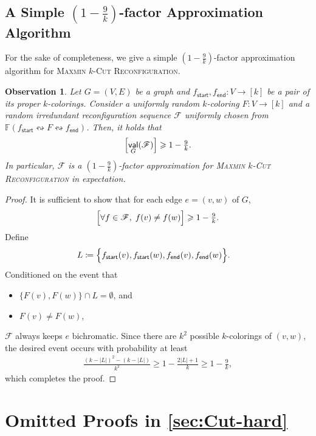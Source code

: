 \documentclass[11pt,fleqn]{article}
\renewcommand{\geq}{\geqslant}
\newcommand{\prb}[1]{\textsc{#1}\xspace}
\newcommand{\reco}{\leftrightsquigarrow}
\newcommand{\defeq}{\coloneq}
\let\E\relax\DeclareMathOperator*{\E}{\mathbb{E}}  \let\Pr\relax\DeclareMathOperator*{\Pr}{\mathbb{Pr}}
\DeclareMathOperator{\val}{\mathsf{val}}
\newcommand{\sss}{\mathsf{start}}
\newcommand{\ttt}{\mathsf{end}}
\newcommand{\f}{f}
\newcommand{\frnd}{F}
\newcommand{\sqcol}{\scrF}
\newcommand{\stsqcol}{\bbF}
\newcommand{\MMkCutReconf}{\prb{Maxmin $k$-Cut Reconfiguration}}
\newcommand{\bbF}{\mathbb{F}}
\newcommand{\scrF}{\mathscr{F}}
\let\Pr\relax\DeclareMathOperator*{\Pr}{\mathbb{P}}
\newtheorem{observation}[theorem]{Observation}
\theoremstyle{definition}
\numberwithin{equation}{section}
\begin{document}
\subsection{A Simple \texorpdfstring{$\left(1-\frac{9}{k}\right)$}{(1-9/k)}-factor Approximation Algorithm}
For the sake of completeness,
we give a simple $\left(1-\frac{9}{k}\right)$-factor approximation algorithm for \MMkCutReconf.

\begin{observation}
\label{obs:Cut-alg:simple}
    Let $G = (V,E)$ be a graph and
    $\f_\sss, \f_\ttt \colon V \to [k]$ be a pair of its proper $k$-colorings.
    Consider a uniformly random $k$-coloring $\frnd \colon V \to [k]$ and
    a random irredundant reconfiguration sequence $\sqcol$
    uniformly chosen from $\stsqcol(\f_\sss \reco \frnd \reco \f_\ttt)$.
    Then, it holds that
    \begin{align}
        \E\Bigl[ \val_G(\sqcol) \Bigr] \geq 1 - \tfrac{9}{k}.
    \end{align}
    In particular,
    $\sqcol$ is a $\left(1-\frac{9}{k}\right)$-factor approximation for
    \MMkCutReconf in expectation.
\end{observation}
\begin{proof} It is sufficient to show that 
for each edge $e = (v,w)$ of $G$,
\begin{align}
     \Pr\Bigl[
        \forall \f \in \sqcol, \;
        \f(v) \neq \f(w)
    \Bigr]
    \geq 1-\tfrac{9}{k}.
\end{align}\noindent
Define
\begin{align}
    L & \defeq \Bigl\{ \f_\sss(v), \f_\sss(w), \f_\ttt(v), \f_\ttt(w) \Bigr\}.
\end{align}
Conditioned on the event that
\begin{itemize}
    \item $\{\frnd(v), \frnd(w)\} \cap L = \emptyset$, and
    \item $\frnd(v) \neq \frnd(w)$,
\end{itemize}
$\sqcol$ always keeps $e$ bichromatic.
Since there are $k^2$ possible $k$-colorings of $(v,w)$,
the desired event occurs with probability at least
\begin{align}
    \frac{(k-|L|)^2 - (k-|L|)}{k^2}
    \geq 1 - \frac{2|L|+1}{k}
    \geq 1 - \tfrac{9}{k},
\end{align}
which completes the proof.
\end{proof}
 
\appendix
\section{Omitted Proofs in \texorpdfstring{\cref{sec:Cut-hard}}{Section~\protect\ref{sec:Cut-hard}}}
\label{app:Cut-hard}
\end{document}

